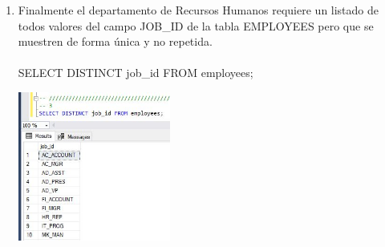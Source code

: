 \begin{enumerate}[1.]
	\item Finalmente el departamento de Recursos Humanos requiere un listado de todos valores del campo JOB\_ID de la tabla EMPLOYEES pero que se muestren de forma única y no repetida.
	\\
	\\SELECT DISTINCT job\_id FROM employees; \\
	\begin{center}
	\includegraphics[width=5cm]{./Imagenes/actividad0203} 
	\end{center}

\end{enumerate}


